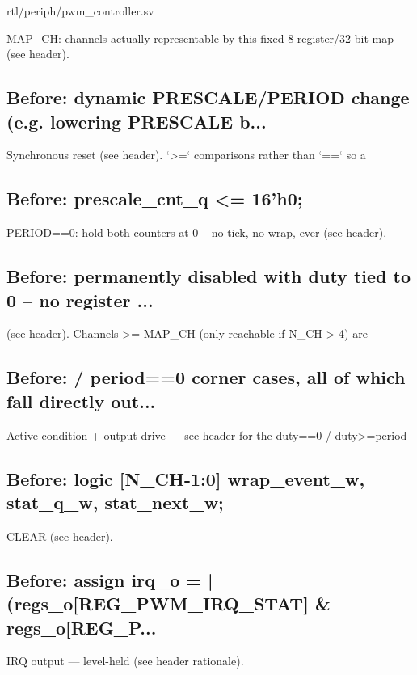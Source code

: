 \begin{relocated}{rtl/periph/pwm_controller.sv}
\begin{textblock}
MAP_CH: channels actually representable by this fixed 8-register/32-bit map (see header).
\end{textblock}

\subsection*{Before: dynamic PRESCALE/PERIOD change (e.g. lowering PRESCALE b...}

\begin{textblock}
Synchronous reset (see header). `>=` comparisons rather than `==` so a
\end{textblock}

\subsection*{Before: prescale\_cnt\_q <= 16'h0;}

\begin{textblock}
PERIOD==0: hold both counters at 0 -- no tick, no wrap, ever (see header).
\end{textblock}

\subsection*{Before: permanently disabled with duty tied to 0 -- no register ...}

\begin{textblock}
(see header). Channels >= MAP_CH (only reachable if N_CH > 4) are
\end{textblock}

\subsection*{Before: / period==0 corner cases, all of which fall directly out...}

\begin{textblock}
Active condition + output drive — see header for the duty==0 / duty>=period
\end{textblock}

\subsection*{Before: logic [N\_CH-1:0] wrap\_event\_w, stat\_q\_w, stat\_next\_w;}

\begin{textblock}
CLEAR (see header).
\end{textblock}

\subsection*{Before: assign irq\_o = |(regs\_o[REG\_PWM\_IRQ\_STAT] \& regs\_o[REG\_P...}

\begin{textblock}
IRQ output — level-held (see header rationale).
\end{textblock}

\end{relocated}

